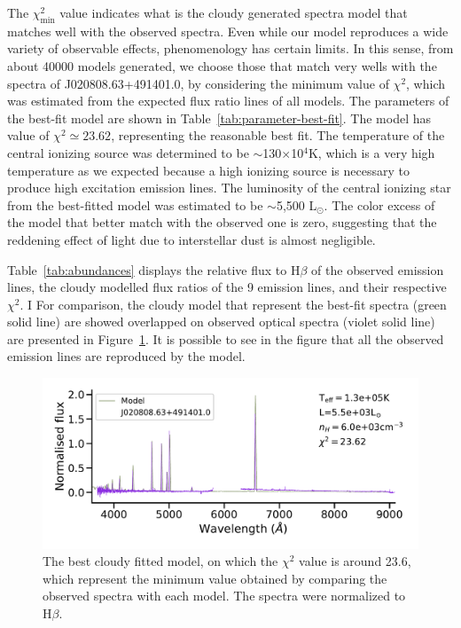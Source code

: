 \documentclass[fleqn,usenatbib]{mnras}
\begin{document}
The $\chi^{2}_{\text{min}}$ value indicates what is the {\sc cloudy} generated
spectra model that matches well with the observed spectra. Even while our model reproduces
a wide variety of observable effects, phenomenology has certain limits.
In this sense, from about 40000 models generated, we choose those that
match very wells with the spectra of J020808.63+491401.0,
by considering the minimum  value of $\chi^{2}$, which was estimated from the
expected flux ratio lines of all models.
The parameters of the best-fit model
are shown in Table~\ref{tab:parameter-best-fit}. The
model has value of $\chi^{2} \simeq 23.62$, representing the reasonable best fit.
The temperature of the central ionizing source was determined to be  $\sim$130$\times$10$^{4}$K,
which is a very high temperature as we expected because a high ionizing source is necessary
to produce high excitation emission lines. The luminosity of the central ionizing star from
the best-fitted model was estimated to be $\sim$5,500 L$_{\odot}$. The color excess of the model that better match with the observed one is zero, suggesting that the reddening effect of light due to interstellar dust is almost negligible.

Table~\ref{tab:abundances} displays the relative flux to H{$\beta$} of the observed emission lines, the {\sc cloudy} modelled flux ratios of the 9 emission lines, and their respective $\chi^{2}$. I For comparison, the {\sc cloudy} model that represent the best-fit spectra (green solid line) are showed overlapped on observed optical spectra (violet solid line) are presented in Figure~\ref{fig:spectra-obs-model}. It is possible to see in the figure that all the observed emission lines
are reproduced by the model. 



\begin{figure}
\centering
\includegraphics[width=\linewidth, trim=10 90 10 10, clip]{Figs/model_130000_37.32_3.78.pdf}
\caption{The best {\sc cloudy} fitted model, on which the $\chi^2$ value is around 23.6, which
  represent the  minimum value obtained by comparing the observed spectra with each model. The spectra were normalized to H{$\beta$}.} 
  \label{fig:spectra-obs-model}
\end{figure}
\end{document}
